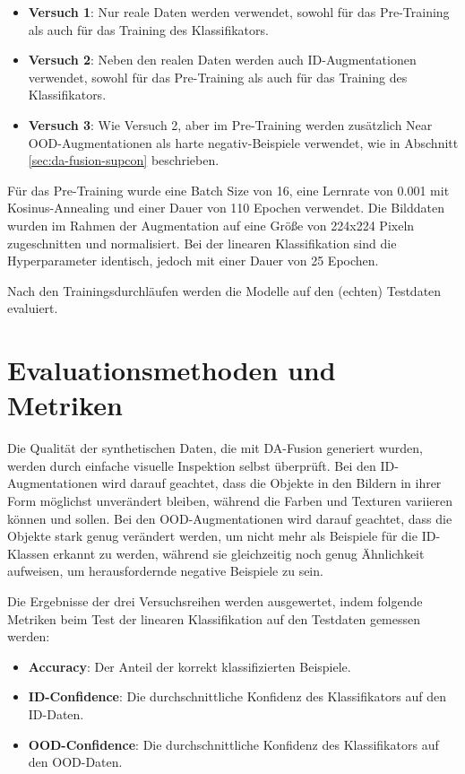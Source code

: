 \begin{itemize} %
	\item \textbf{Versuch 1}: Nur reale Daten werden verwendet, sowohl für das Pre-Training als auch für das Training des Klassifikators.
	\item \textbf{Versuch 2}: Neben den realen Daten werden auch ID-Augmentationen verwendet, sowohl für das Pre-Training als auch für das Training des Klassifikators.
	\item \textbf{Versuch 3}: Wie Versuch 2, aber im Pre-Training werden zusätzlich Near OOD-Augmentationen als harte negativ-Beispiele verwendet, wie in Abschnitt \ref{sec:da-fusion-supcon} beschrieben.
\end{itemize}

Für das Pre-Training wurde eine Batch Size von 16, eine Lernrate von 0.001 mit Kosinus-Annealing und einer Dauer von 110 Epochen verwendet. Die Bilddaten wurden im Rahmen der Augmentation auf eine Größe von 224x224 Pixeln zugeschnitten und normalisiert. Bei der linearen Klassifikation sind die Hyperparameter identisch, jedoch mit einer Dauer von 25 Epochen.

Nach den Trainingsdurchläufen werden die Modelle auf den (echten) Testdaten evaluiert.

\section{Evaluationsmethoden und Metriken} \label{sec:evaluation}

Die Qualität der synthetischen Daten, die mit DA-Fusion generiert wurden, werden durch einfache visuelle Inspektion selbst überprüft. Bei den ID-Augmentationen wird darauf geachtet, dass die Objekte in den Bildern in ihrer Form möglichst unverändert bleiben, während die Farben und Texturen variieren können und sollen. Bei den OOD-Augmentationen wird darauf geachtet, dass die Objekte stark genug verändert werden, um nicht mehr als Beispiele für die ID-Klassen erkannt zu werden, während sie gleichzeitig noch genug Ähnlichkeit aufweisen, um herausfordernde negative Beispiele zu sein.

Die Ergebnisse der drei Versuchsreihen werden ausgewertet, indem folgende Metriken beim Test der linearen Klassifikation auf den Testdaten gemessen werden:

\begin{itemize}
	\item \textbf{Accuracy}: Der Anteil der korrekt klassifizierten Beispiele.
	\item \textbf{ID-Confidence}: Die durchschnittliche Konfidenz des Klassifikators auf den ID-Daten.
	\item \textbf{OOD-Confidence}: Die durchschnittliche Konfidenz des Klassifikators auf den OOD-Daten.
\end{itemize}
